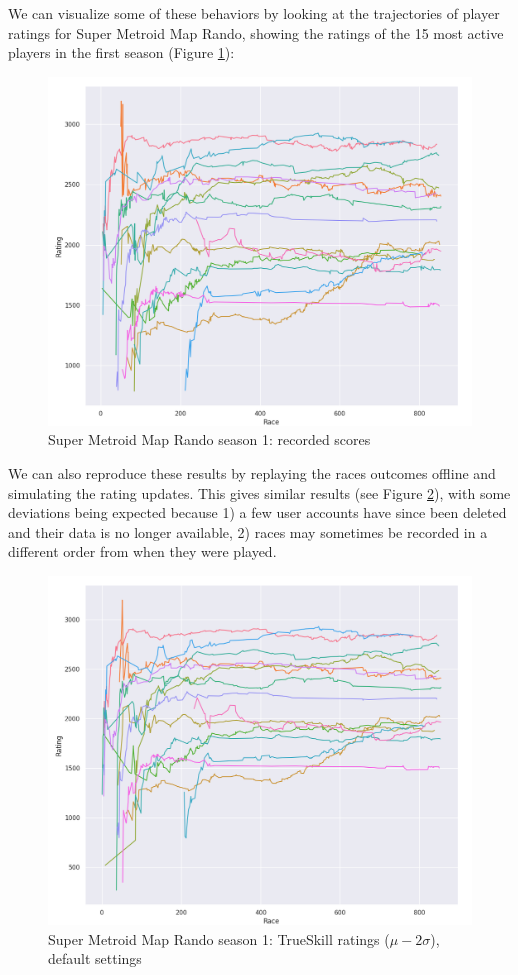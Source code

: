 \documentclass{article}
\begin{document}
	We can visualize some of these behaviors by looking at the trajectories of
	player ratings for Super Metroid Map Rando, showing the ratings of the 15 most active players in the first season (Figure \ref{fig:s1_real_scores}):
	\begin{figure}
	\centering
	\includegraphics[width=0.75\linewidth]{figures/s1_real_scores.png}
	\caption{Super Metroid Map Rando season 1: recorded scores}
	\label{fig:s1_real_scores}
	\end{figure}
	We can also reproduce these results by replaying the races outcomes offline and simulating the rating updates. This gives similar results (see Figure \ref{fig:s1_trueskill_default}), with some deviations being expected because 1) a few user accounts have since been deleted and their data is no longer available, 2) races may sometimes be recorded in a different order from when they were played.
	\begin{figure}
	\centering
	\includegraphics[width=0.75\linewidth]{figures/s1_trueskill_default.png}
	\caption{Super Metroid Map Rando season 1: TrueSkill ratings ($\mu - 2\sigma$), default settings}
	\label{fig:s1_trueskill_default}
	\end{figure}
\end{document}
